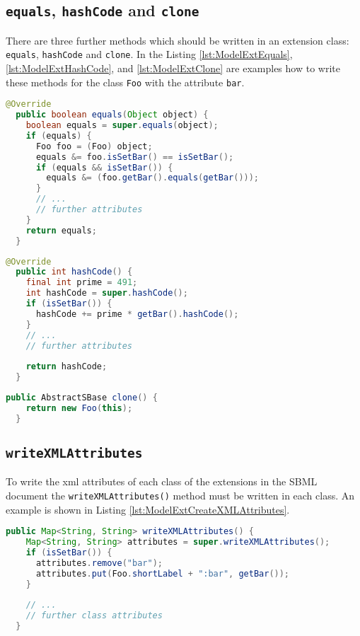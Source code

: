 \subsection{\texttt{equals}, \texttt{hashCode} and \texttt{clone}}
There are three further methods which should be written in an extension class: \texttt{equals}, \texttt{hashCode} and \texttt{clone}. In the Listing \ref{lst:ModelExtEquals}, \ref{lst:ModelExtHashCode}, and \ref{lst:ModelExtClone} are examples how to write these methods for the class \texttt{Foo} with the attribute \texttt{bar}.

\begin{lstlisting}[language=Java,caption={Example of the \texttt{equals} method},label={lst:ModelExtEquals}]
@Override
  public boolean equals(Object object) {
    boolean equals = super.equals(object);
    if (equals) {
      Foo foo = (Foo) object;
      equals &= foo.isSetBar() == isSetBar();
      if (equals && isSetBar()) {
        equals &= (foo.getBar().equals(getBar()));
      }
      // ...
      // further attributes
    }
    return equals;
  }
\end{lstlisting}


\begin{lstlisting}[language=Java,caption={Example of the \texttt{hashCode} method. The variable \texttt{prime} should be a big prime number to prevent collisions},label={lst:ModelExtHashCode}]
  @Override
  public int hashCode() {
    final int prime = 491;
    int hashCode = super.hashCode();
    if (isSetBar()) {
      hashCode += prime * getBar().hashCode();
    }
    // ...
    // further attributes
    
    return hashCode;
  }
\end{lstlisting}

\begin{lstlisting}[language=Java,caption={Example of the \texttt{clone} method},label={lst:ModelExtClone}]
  public AbstractSBase clone() {
    return new Foo(this);
  }
\end{lstlisting}


\subsection{\texttt{writeXMLAttributes}}
To write the xml attributes of each class of the extensions in the SBML document the \texttt{writeXMLAttributes()} method must be written in each class. An example is shown in Listing \ref{lst:ModelExtCreateXMLAttributes}.

\begin{lstlisting}[language=Java,caption={Method to create the XML attributes},label={lst:ModelExtCreateXMLAttributes}]
  public Map<String, String> writeXMLAttributes() {
    Map<String, String> attributes = super.writeXMLAttributes();
    if (isSetBar()) {
      attributes.remove("bar");
      attributes.put(Foo.shortLabel + ":bar", getBar());
    }
    
    // ...
    // further class attributes
  }
\end{lstlisting}



